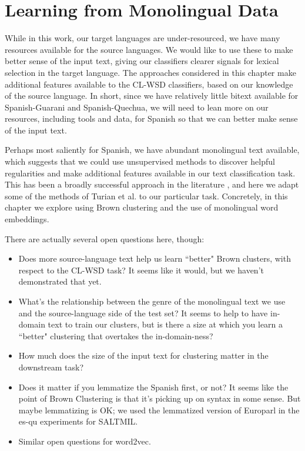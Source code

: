 \chapter{Learning from Monolingual Data}
\label{chap:monolingual}
While in this work, our target languages are under-resourced, we have many
resources available for the source languages. We would like to use these to
make better sense of the input text, giving our classifiers clearer signals for
lexical selection in the target language.
The approaches considered in this chapter make additional features available to
the CL-WSD classifiers, based on our knowledge of the source language.
In short, since we have relatively little bitext available for Spanish-Guarani
and Spanish-Quechua, we will need to lean more on our resources, including
tools and data, for Spanish so that we can better make sense of the input text.

Perhaps most saliently for Spanish, we have abundant monolingual text
available, which suggests that we could use unsupervised methods to discover
helpful regularities and make additional features available in our text
classification task. This has been a broadly successful
approach in the literature \cite{turian-ratinov-bengio:2010:ACL}, and here we
adapt some of the methods of Turian et al. to our particular task. Concretely,
in this chapter we explore using Brown clustering \cite{brown1992class} and the
use of monolingual word embeddings.


There are actually several open questions here, though:

\begin{itemize}
  \item Does more source-language text help us learn ``better" Brown clusters,
    with respect to the CL-WSD task? It seems like it would, but we haven't
    demonstrated that yet.
  \item What's the relationship between the genre of the monolingual text we
    use and the source-language side of the test set? It seems to help to have
    in-domain text to train our clusters, but is there a size at which you
    learn a ``better" clustering that overtakes the in-domain-ness?
  \item How much does the size of the input text for clustering matter in the
  downstream task?
  \item Does it matter if you lemmatize the Spanish first, or not? It seems
    like the point of Brown Clustering is that it's picking up on syntax in
    some sense. But maybe lemmatizing is OK; we used the lemmatized version of
    Europarl in the es-qu experiments for SALTMIL.
  \item Similar open questions for word2vec.
\end{itemize}


